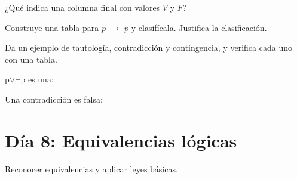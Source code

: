 \begin{activity}[id=dia-07-corta-06,type=short,weight=1]

¿Qué indica una columna final con valores \(V\) y \(F\)?

\end{activity}

\begin{activity}[id=dia-07-desarrollo-01,type=long,weight=2]

Construye una tabla para \(p\) \(\to\) \(p\) y clasifícala. Justifica la clasificación.

\end{activity}

\begin{activity}[id=dia-07-desarrollo-02,type=long,weight=2]

Da un ejemplo de tautología, contradicción y contingencia, y verifica cada uno con una tabla.

\end{activity}

\begin{activity}[id=dia-07-opcion-01,type=choice,weight=1]

p\(\lor\)\(\neg\)p es una:





\end{activity}

\begin{activity}[id=dia-07-opcion-02,type=choice,weight=1]

Una contradicción es falsa:





\end{activity}

\section{Día 8: Equivalencias lógicas}

\begin{lesson}[id=dia-08-lectura,weight=0]

Reconocer equivalencias y aplicar leyes básicas.

\end{lesson}

